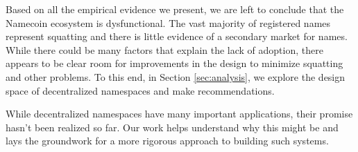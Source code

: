 
Based on all the empirical evidence we present, we are left to conclude that the Namecoin ecosystem is dysfunctional. The vast majority of registered names represent squatting and there is little evidence of a secondary market for names. While there could be many factors that explain the lack of adoption, there appears to be clear room for improvements in the design to minimize squatting and other problems. To this end, in Section \ref{sec:analysis}, we explore the design space of decentralized namespaces and make recommendations.

While decentralized namespaces have many important applications, their promise hasn't been realized so far. Our work helps understand why this might be and lays the groundwork for a more rigorous approach to building such systems.

